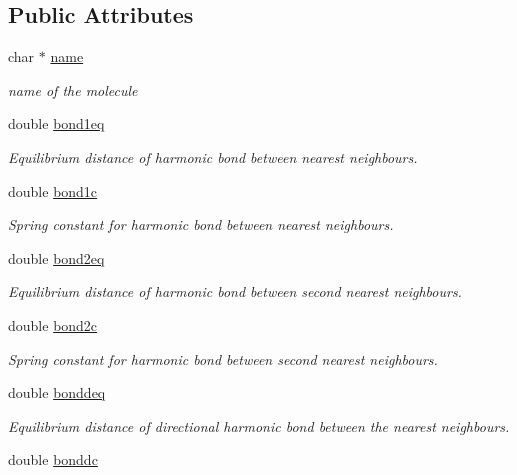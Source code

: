 \subsection*{Public Attributes}
\begin{DoxyCompactItemize}
\item 
char $\ast$ \hyperlink{class_molecule_params_a9b478628f7e50569a41fdfb6dacfabfa}{name}
\begin{DoxyCompactList}\small\item\em name of the molecule \end{DoxyCompactList}\item 
double \hyperlink{class_molecule_params_af3ba3ec166a3d31ce27c707679dd7335}{bond1eq}
\begin{DoxyCompactList}\small\item\em Equilibrium distance of harmonic bond between nearest neighbours. \end{DoxyCompactList}\item 
double \hyperlink{class_molecule_params_a48d2ea6681c8eb398d74610cffab8594}{bond1c}
\begin{DoxyCompactList}\small\item\em Spring constant for harmonic bond between nearest neighbours. \end{DoxyCompactList}\item 
double \hyperlink{class_molecule_params_a7ba670c7097cbef3dbbaaf995f726f7e}{bond2eq}
\begin{DoxyCompactList}\small\item\em Equilibrium distance of harmonic bond between second nearest neighbours. \end{DoxyCompactList}\item 
double \hyperlink{class_molecule_params_a69fcc0cfc455c73f910b379860900a16}{bond2c}
\begin{DoxyCompactList}\small\item\em Spring constant for harmonic bond between second nearest neighbours. \end{DoxyCompactList}\item 
double \hyperlink{class_molecule_params_a55f6fb3edc8ca69966b06a6370f5c5c0}{bonddeq}
\begin{DoxyCompactList}\small\item\em Equilibrium distance of directional harmonic bond between the nearest neighbours. \end{DoxyCompactList}\item 
double \hyperlink{class_molecule_params_ae2c76f8dd300d5f70dbd905fea428e59}{bonddc}

\end{DoxyCompactItemize}
